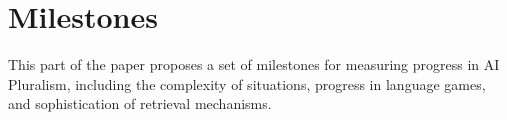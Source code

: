 \section{Milestones}
This part of the paper proposes a set of milestones for measuring progress in AI Pluralism, including the complexity of situations, progress in language games, and sophistication of retrieval mechanisms.
